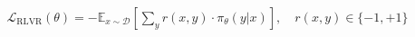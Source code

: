 \documentclass[preview]{standalone}
\begin{document}
\begin{align*}
\mathcal{L}_{\mathrm{RLVR}}(\theta) = -\mathbb{E}_{x \sim \mathcal{D}}\left[\sum_{y} r(x, y)\cdot\pi_{\theta}(y|x)\right] , \quad r(x,y) \in \{-1, +1\}
\end{align*}
\end{document}
